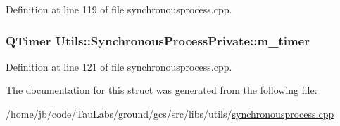\-Definition at line 119 of file synchronousprocess.\-cpp.

\hypertarget{struct_utils_1_1_synchronous_process_private_a3fe987ce5909ead1e57e259369e56178}{
\subsubsection[{m\-\_\-timer}]{\setlength{\rightskip}{0pt plus 5cm}\-Q\-Timer {\bf \-Utils\-::\-Synchronous\-Process\-Private\-::m\-\_\-timer}}}\label{struct_utils_1_1_synchronous_process_private_a3fe987ce5909ead1e57e259369e56178}


\-Definition at line 121 of file synchronousprocess.\-cpp.



\-The documentation for this struct was generated from the following file\-:\begin{DoxyCompactItemize}
\item 
/home/jb/code/\-Tau\-Labs/ground/gcs/src/libs/utils/\hyperlink{synchronousprocess_8cpp}{synchronousprocess.\-cpp}\end{DoxyCompactItemize}
